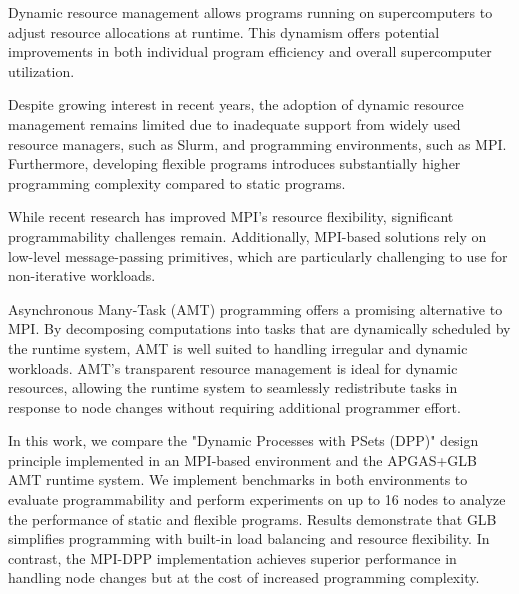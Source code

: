 Dynamic resource management allows programs running on supercomputers to adjust resource allocations at runtime. This dynamism offers potential improvements in both individual program efficiency and overall supercomputer utilization.

Despite growing interest in recent years, the adoption of dynamic resource management remains limited due to inadequate support from widely used resource managers, such as Slurm, and programming environments, such as MPI. Furthermore, developing flexible programs introduces substantially higher programming complexity compared to static programs.

While recent research has improved MPI's resource flexibility, significant programmability challenges remain. Additionally, MPI-based solutions rely on low-level message-passing primitives, which are particularly challenging to use for non-iterative workloads.

Asynchronous Many-Task (AMT) programming offers a promising alternative to MPI. By decomposing computations into tasks that are dynamically scheduled by the runtime system, AMT is well suited to handling irregular and dynamic workloads. AMT's transparent resource management is ideal for dynamic resources, allowing the runtime system to seamlessly redistribute tasks in response to node changes without requiring additional programmer effort.

In this work, we compare the "Dynamic Processes with PSets (DPP)" design principle implemented in an MPI-based environment and the APGAS+GLB AMT runtime system. We implement benchmarks in both environments to evaluate programmability and perform experiments on up to 16 nodes to analyze the performance of static and flexible programs. Results demonstrate that GLB simplifies programming with built-in load balancing and resource flexibility. In contrast, the MPI-DPP implementation achieves superior performance in handling node changes but at the cost of increased programming complexity.

